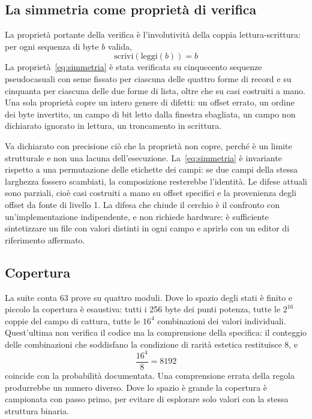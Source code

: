 \documentclass[11pt,a4paper]{article}
\begin{document}
\subsection{La simmetria come proprietà di verifica}

La proprietà portante della verifica è l'involutività della coppia lettura-scrittura: per ogni sequenza di byte $b$ valida,
\begin{equation}
\mathrm{scrivi}(\mathrm{leggi}(b)) = b
\label{eq:simmetria}
\end{equation}
La proprietà~\eqref{eq:simmetria} è stata verificata su cinquecento sequenze pseudocasuali con seme fissato per ciascuna delle quattro forme di record e su cinquanta per ciascuna delle due forme di lista, oltre che su casi costruiti a mano. Una sola proprietà copre un intero genere di difetti: un offset errato, un ordine dei byte invertito, un campo di bit letto dalla finestra sbagliata, un campo non dichiarato ignorato in lettura, un troncamento in scrittura.

Va dichiarato con precisione ciò che la proprietà non copre, perché è un limite strutturale e non una lacuna dell'esecuzione. La~\eqref{eq:simmetria} è invariante rispetto a una permutazione delle etichette dei campi: se due campi della stessa larghezza fossero scambiati, la composizione resterebbe l'identità. Le difese attuali sono parziali, cioè casi costruiti a mano su offset specifici e la provenienza degli offset da fonte di livello 1. La difesa che chiude il cerchio è il confronto con un'implementazione indipendente, e non richiede hardware: è sufficiente sintetizzare un file con valori distinti in ogni campo e aprirlo con un editor di riferimento affermato.

\subsection{Copertura}

La suite conta 63 prove su quattro moduli. Dove lo spazio degli stati è finito e piccolo la copertura è esaustiva: tutti i 256 byte dei punti potenza, tutte le $2^{16}$ coppie del campo di cattura, tutte le $16^4$ combinazioni dei valori individuali. Quest'ultima non verifica il codice ma la comprensione della specifica: il conteggio delle combinazioni che soddisfano la condizione di rarità estetica restituisce 8, e
\begin{equation}
\frac{16^4}{8} = 8192
\end{equation}
coincide con la probabilità documentata. Una comprensione errata della regola produrrebbe un numero diverso. Dove lo spazio è grande la copertura è campionata con passo primo, per evitare di esplorare solo valori con la stessa struttura binaria.
\end{document}
